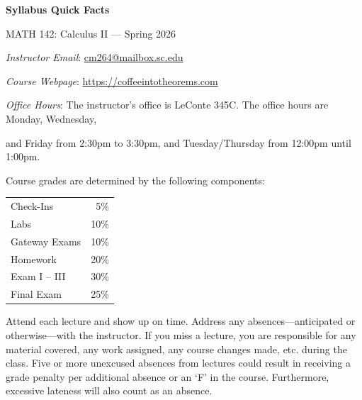 \documentclass[11pt,letterpaper]{article}
\begin{document}
\begin{center} 
\bfseries
\color{scred}
\LARGE Syllabus Quick Facts \par\vspace{0.2\baselineskip}
\Large MATH 142: Calculus II --- Spring 2026
\end{center} \pspace


\hspace{0.53cm} {\itshape Instructor Email}: \href{mailto:cm264@mailbox.sc.edu}{cm264@mailbox.sc.edu} \par
\hspace{0.53cm} {\itshape Course Webpage}: \href{https://coffeeintotheorems.com}{https://coffeeintotheorems.com} \par
\hspace{0.53cm} {\itshape Office Hours}: The instructor's office is LeConte 345C. The office hours are Monday, Wednesday, \par \hspace{0.55cm} and Friday from 2:30pm to 3:30pm, and Tuesday/Thursday from 12:00pm until 1:00pm. \pspace


Course grades are determined by the following components: \par \vspace{-0.3cm}
	\begin{table}[!ht]
        \begin{tabular}{lr}
	Check-Ins & 5\% \\
	Labs & 10\% \\
	Gateway Exams& 10\% \\
	Homework & 20\% \\
	Exam I -- III & 30\% \\
	Final Exam & 25\%
        \end{tabular} 
        \end{table}


Attend each lecture and show up on time. Address any absences---anticipated or otherwise---with the instructor. If you miss a lecture, you are responsible for any material covered, any work assigned, any course changes made, etc. during the class. Five or more unexcused absences from lectures could result in receiving a grade penalty per additional absence or an `F' in the course. Furthermore, excessive lateness will also count as an absence. 
\pspace
\end{document}
